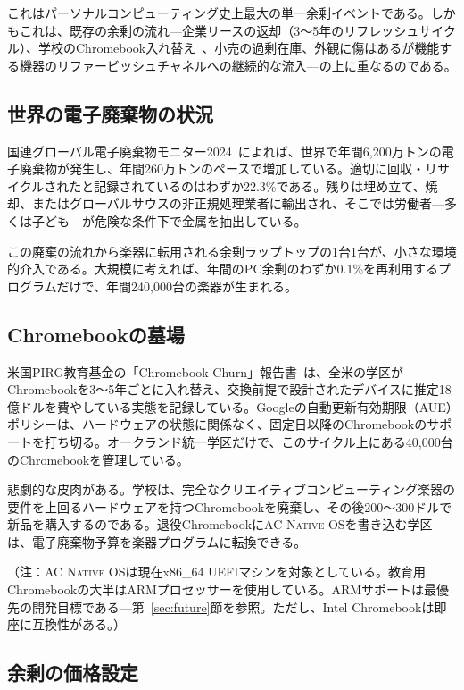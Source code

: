 \documentclass[10pt,letterpaper,twocolumn]{article}
\newcommand{\acos}{\textsc{AC Native OS}}
\begin{document}
これはパーソナルコンピューティング史上最大の単一余剰イベントである。しかもこれは、既存の余剰の流れ---企業リースの返却（3〜5年のリフレッシュサイクル）、学校のChromebook入れ替え~\citep{pirg2023chromebook}、小売の過剰在庫、外観に傷はあるが機能する機器のリファービッシュチャネルへの継続的な流入---の上に重なるのである。

\subsection{世界の電子廃棄物の状況}

国連グローバル電子廃棄物モニター2024~\citep{forti2024ewaste}によれば、世界で年間6,200万トンの電子廃棄物が発生し、年間260万トンのペースで増加している。適切に回収・リサイクルされたと記録されているのはわずか22.3\%である。残りは埋め立て、焼却、またはグローバルサウスの非正規処理業者に輸出され、そこでは労働者---多くは子ども---が危険な条件下で金属を抽出している。

この廃棄の流れから楽器に転用される余剰ラップトップの1台1台が、小さな環境的介入である。大規模に考えれば、年間のPC余剰のわずか0.1\%を再利用するプログラムだけで、年間240,000台の楽器が生まれる。

\subsection{Chromebookの墓場}

米国PIRG教育基金の「Chromebook Churn」報告書~\citep{pirg2023chromebook}は、全米の学区がChromebookを3〜5年ごとに入れ替え、交換前提で設計されたデバイスに推定18億ドルを費やしている実態を記録している。Googleの自動更新有効期限（AUE）ポリシーは、ハードウェアの状態に関係なく、固定日以降のChromebookのサポートを打ち切る。オークランド統一学区だけで、このサイクル上にある40,000台のChromebookを管理している。

悲劇的な皮肉がある。学校は、完全なクリエイティブコンピューティング楽器の要件を上回るハードウェアを持つChromebookを廃棄し、その後200〜300ドルで新品を購入するのである。退役Chromebookに\acos{}を書き込む学区は、電子廃棄物予算を楽器プログラムに転換できる。

（注：\acos{}は現在x86\_64 UEFIマシンを対象としている。教育用Chromebookの大半はARMプロセッサーを使用している。ARMサポートは最優先の開発目標である---第~\ref{sec:future}節を参照。ただし、Intel Chromebookは即座に互換性がある。）

\subsection{余剰の価格設定}
\end{document}
